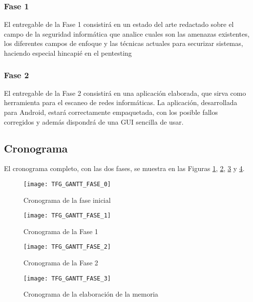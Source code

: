 \subsubsection{Fase 1}
El entregable de la Fase 1 consistirá en un estado del arte redactado sobre el campo de la seguridad informática que analice cuales son las amenazas existentes, los diferentes campos de enfoque y las técnicas actuales para securizar sistemas, haciendo especial hincapié en el pentesting

\subsubsection{Fase 2}
El entregable de la Fase 2 consistirá en una aplicación elaborada, que sirva como herramienta para el escaneo de redes informáticas. La aplicación, desarrollada para Android, estará correctamente empaquetada, con los posible fallos corregidos y además dispondrá de una GUI sencilla de usar.

\subsection{Cronograma}
El cronograma completo, con las dos fases, se muestra en las Figuras \ref{fig:gantt0}, \ref{fig:gantt1}, \ref{fig:gantt2} y \ref{fig:gantt3}.

\begin{figure}[H]
	\centering
	\texttt{[image: TFG\_GANTT\_FASE\_0]}
	\caption{Cronograma de la fase inicial}
	\label{fig:gantt0}
\end{figure}

\begin{landscape}

\begin{figure}[H]
	\centering
	\texttt{[image: TFG\_GANTT\_FASE\_1]}
	\caption{Cronograma de la Fase 1}
	\label{fig:gantt1}
\end{figure}

\begin{figure}[H]
	\centering
	\texttt{[image: TFG\_GANTT\_FASE\_2]}
	\caption{Cronograma de la Fase 2}
	\label{fig:gantt2}
\end{figure}

\end{landscape}

\begin{figure}[H]
	\centering
	\texttt{[image: TFG\_GANTT\_FASE\_3]}
	\caption{Cronograma de la elaboración de la memoria}
	\label{fig:gantt3}
\end{figure}



